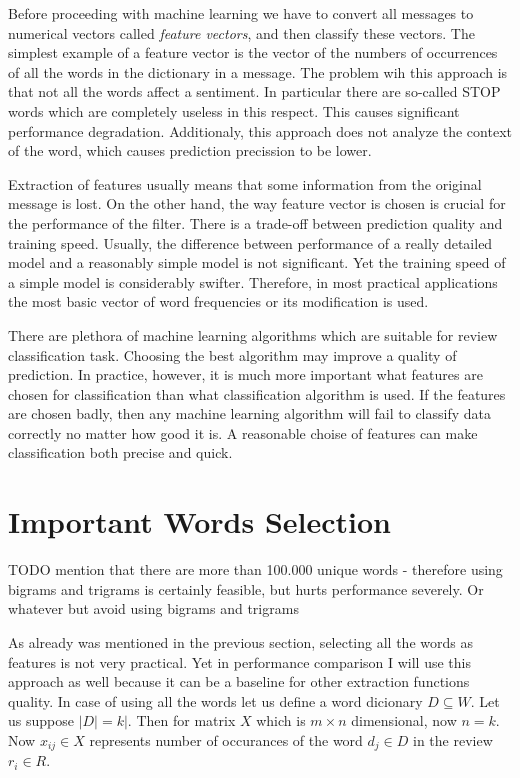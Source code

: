 \documentclass[12pt]{report}
\begin{document}
Before proceeding with machine learning we have to convert all messages to numerical vectors called \textit{feature vectors}, and then classify these vectors. The simplest example of a feature vector is the vector of the numbers of occurrences of all the words in the dictionary in a message. The problem wih this approach is that not all the words affect a sentiment. In particular there are so-called STOP words which are completely useless in this respect. This causes significant performance degradation. Additionaly, this approach does not analyze the context of the word, which causes prediction precission to be lower.

Extraction of features usually means that some information from the original message is lost. On the other hand, the way feature vector is chosen is crucial for the performance of the filter. There is a trade-off between prediction quality and training speed. Usually, the difference between performance of a really detailed model and a reasonably simple model is not significant. Yet the training speed of a simple model is considerably swifter. Therefore, in most practical applications the most basic vector of word frequencies or its modification is used.

There are plethora of machine learning algorithms which are suitable for review classification task. Choosing the best algorithm may improve a quality of prediction. In practice, however, it is much more important what features are chosen for classification than what classification algorithm is used. If the features are chosen badly, then any machine learning algorithm will fail to classify data correctly no matter how good it is. A reasonable choise of features can make classification both precise and quick.

\newpage

\section{Important Words Selection}

TODO mention that there are more than 100.000 unique words - therefore using bigrams and trigrams is certainly feasible, but hurts performance severely. Or whatever but avoid using bigrams and trigrams

As already was mentioned in the previous section, selecting all the words as features is not very practical. Yet in performance comparison I will use this approach as well because it can be a baseline for other extraction functions quality. In case of using all the words let us define a word dicionary $D \subseteq W$. Let us suppose $|D| = k|$. Then for matrix $X$ which is $m \times n$ dimensional, now $n = k$. Now $x_{ij} \in X$ represents number of occurances of the word $d_j \in D$ in the review $r_i \in R$.
\end{document}
